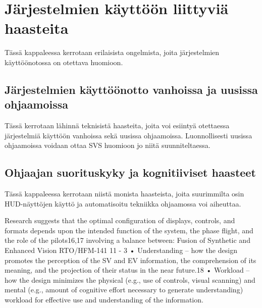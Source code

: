 \documentclass[utf8,bachelor,manualbib]{gradu3}
\begin{document}
\chapter{Järjestelmien käyttöön liittyviä haasteita}

Tässä kappaleessa kerrotaan erilaisista ongelmista, joita järjestelmien käyttöönotossa on otettava huomioon.

\section{Järjestelmien käyttöönotto vanhoissa ja uusissa ohjaamoissa}

Tässä kerrotaan lähinnä teknisistä haasteita, joita voi esiintyä otettaessa järjestelmiä käyttöön vanhoissa sekä uusissa ohjaamoissa. Luonnollisesti uusissa ohjaamoissa voidaan ottaa SVS huomioon jo niitä suunniteltaessa.

\section{Ohjaajan suorituskyky ja kognitiiviset haasteet}

Tässä kappaleessa kerrotaan niistä monista haasteista, joita suurimmilta osin HUD-näyttöjen käyttö ja automatisoitu tekniikka ohjaamossa voi aiheuttaa.

Research suggests that the optimal configuration of displays, controls, and formats depends upon the intended
function of the system, the phase flight, and the role of the pilots16,17 involving a balance between:
Fusion of Synthetic and Enhanced Vision
RTO/HFM-141 11 - 3
• Understanding – how the design promotes the perception of the SV and EV information, the
comprehension of its meaning, and the projection of their status in the near future.18
• Workload – how the design minimizes the physical (e.g., use of controls, visual scanning) and mental
(e.g., amount of cognitive effort necessary to generate understanding) workload for effective use and
understanding of the information.  \citep{baileyym2007}
\end{document}
